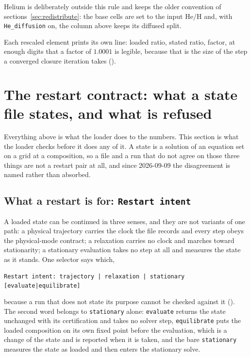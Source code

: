\documentclass[english,a4paper]{my_memo}
\begin{document}
Helium is deliberately outside this rule and keeps the older convention of
sections~\ref{sec:redistribute}: the base cells are set to the input
$\mathrm{He/H}$ and, with \verb|He_diffusion| on, the column above keeps its
diffused split.

Each rescaled element prints its own line: loaded ratio, stated ratio,
factor, at enough digits that a factor of $1.0001$ is legible, because that
is the size of the step a converged closure iteration takes
().

\section{The restart contract: what a state file states, and what is refused}
\label{sec:contract}

Everything above is what the loader does to the numbers. This section is
what the loader checks before it does any of it. A state is a solution of an
equation set on a grid at a composition, so a file and a run that do not
agree on those three things are not a restart pair at all, and since
2026-09-09 the disagreement is named rather than absorbed.

\subsection{What a restart is for: \texttt{Restart intent}}

A loaded state can be continued in three senses, and they are not variants
of one path: a physical trajectory carries the clock the file records and
every step obeys the physical-mode contract; a relaxation carries no clock
and marches toward stationarity; a stationary evaluation takes no step at
all and measures the state as it stands. One selector says which,
%
\begin{center}
\verb+Restart intent: trajectory | relaxation | stationary [evaluate|equilibrate]+
\end{center}
%
because a run that does not state its purpose cannot be checked against it
(). The second word belongs to
\verb|stationary| alone: \verb|evaluate| returns the state unchanged with
its certification and takes no solver step, \verb|equilibrate| puts the
loaded composition on its own fixed point before the evaluation, which is a
change of the state and is reported when it is taken, and the bare
\verb|stationary| measures the state as loaded and then enters the
stationary solve.
\end{document}
